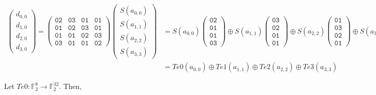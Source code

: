 \begin{align*}
\begin{pmatrix}
	d_{0,0} \\ d_{1,0} \\ d_{2,0} \\ d_{3,0}
\end{pmatrix} = \begin{pmatrix}
	\texttt{02} & \texttt{03} & \texttt{01} & \texttt{01} \\
	\texttt{01} & \texttt{02} & \texttt{03} & \texttt{01} \\
	\texttt{01} & \texttt{01} & \texttt{02} & \texttt{03} \\
	\texttt{03} & \texttt{01} & \texttt{01} & \texttt{02}
\end{pmatrix}\begin{pmatrix}
	S(a_{0,0}) \\ S(a_{1,1}) \\ S(a_{2,2}) \\ S(a_{3,3})
\end{pmatrix} &=
S(a_{0,0})\begin{pmatrix} \texttt{02} \\ \texttt{01} \\ \texttt{01} \\ \texttt{03} \end{pmatrix}\oplus
S(a_{1,1})\begin{pmatrix} \texttt{03} \\ \texttt{02} \\ \texttt{01} \\ \texttt{01} \end{pmatrix}\oplus
S(a_{2,2})\begin{pmatrix} \texttt{01} \\ \texttt{03} \\ \texttt{02} \\ \texttt{01} \end{pmatrix}\oplus
S(a_{3,3})\begin{pmatrix} \texttt{01} \\ \texttt{01} \\ \texttt{03} \\ \texttt{02} \end{pmatrix} \\
& = Te0(a_{0,0}) \oplus Te1(a_{1,1}) \oplus Te2(a_{2,2}) \oplus Te3(a_{3,3})
\end{align*}

\noindent Let $Te0: \mathbb{F}_2^8 \to \mathbb{F}_2^{32}$. Then,

